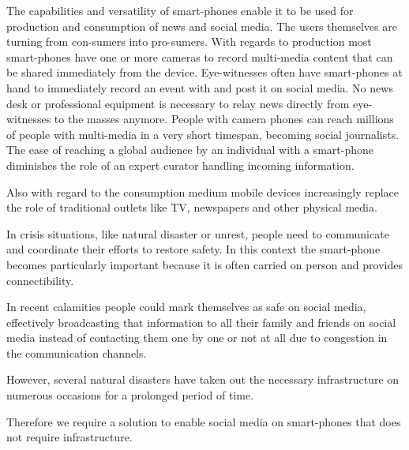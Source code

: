 The capabilities and versatility of smart-phones enable it to be used for production and consumption of news and social media.
The users themselves are turning from con-sumers into pro-sumers.
With regards to production most smart-phones have one or more cameras to record multi-media content that can be shared immediately from the device.
Eye-witnesses often have smart-phones at hand to immediately record an event with and post it on social media.
No news desk or professional equipment is necessary to relay news directly from eye-witnesses to the masses anymore.
People with camera phones can reach millions of people with multi-media in a very short timespan, becoming social journalists.
The ease of reaching a global audience by an individual with a smart-phone diminishes the role of an expert curator handling incoming information.

Also with regard to the consumption medium mobile devices increasingly replace the role of traditional outlets like TV, newspapers and other physical media.

In crisis situations, like natural disaster or unrest, people need to communicate and coordinate their efforts to restore safety.
In this context the smart-phone becomes particularly important because it is often carried on person and provides connectibility.

In recent calamities people could mark themselves as safe on social media, effectively broadcasting that information to all their family and friends on social media instead of contacting them one by one or not at all due to congestion in the communication channels.

However, several natural disasters have taken out the necessary infrastructure on numerous occasions for a prolonged period of time. %

Therefore we require a solution to enable social media on smart-phones that does not require infrastructure. %


